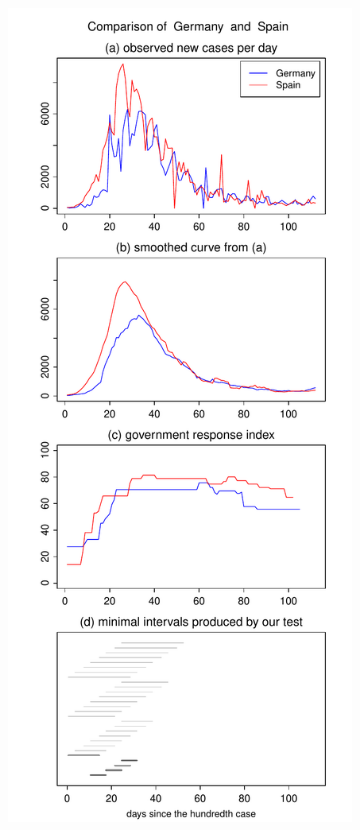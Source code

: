 \documentclass[a4paper,12pt]{article}
\numberwithin{equation}{section}
\begin{document}
\begin{figure}[t!]
\begin{subfigure}[b]{0.49\textwidth}
\includegraphics[width=\textwidth]{plots/DEU_vs_ESP}

\end{subfigure}
\end{figure}
\end{document}
